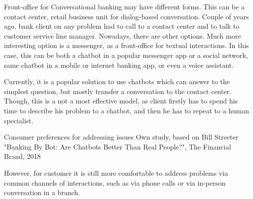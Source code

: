 Front-office for Conversational banking may have different forms.
This can be a contact center, retail business unit for dialog-based conversation.
Couple of years ago, bank client on any problem had to call to a contact center and to talk to customer service line manager. 
\cite{trillion_opportunity}
Nowadays, there are other options.
Much more interesting option is a messenger, as a front-office for textual interactions.
In this case, this can be both a chatbot in a popular messenger app or a social network, same chatbot in a mobile or internet banking app, or even a voice assistant.

Currently, it is a popular solution to use chatbots which can answer to the simplest question, but mostly transfer a conversation to the contact center.
Though, this is a not a most effective model, as client firstly has to spend his time to describe his problem to a chatbot, and then he has to repeat to a human specialist.
\cite{accenture_conversational_banking}

\mttable
{Consumer preferences for addressing issues}
{Own study, based on Bill Streeter "Banking By Bot: Are Chatbots Better Than Real People?", The \allowbreak Financial Brand, 2018}
{
}
    
However, for customer it is still more comfortable to address problems via common channels of interactions, such as via phone calls or via in-person conversation in a branch.
\cite{humley_banking_report}

